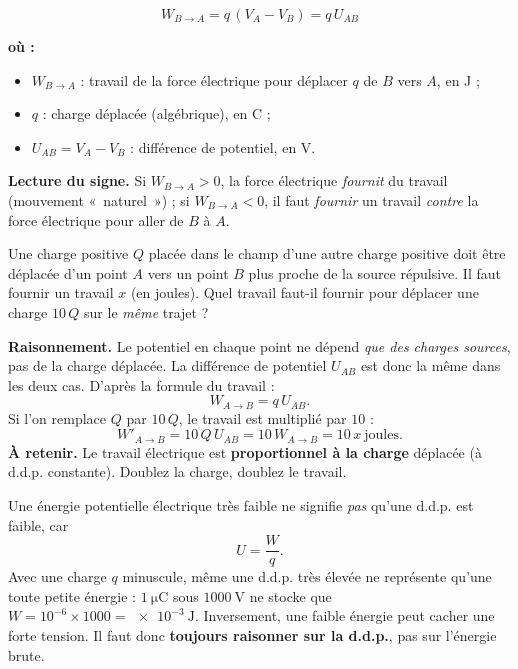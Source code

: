 \documentclass[11pt,a4paper]{article}
\newenvironment{ou}{%
  \par\smallskip\noindent\textbf{où :}\nopagebreak
  \begin{itemize}[leftmargin=1.8em,topsep=2pt,itemsep=1.5pt,parsep=0pt]}%
  {\end{itemize}}
\begin{document}
\begin{formule}
\[ \boxed{\;W_{B\to A} = q\,(V_A - V_B) = q\,U_{AB}\;} \]
\begin{ou}
  \item $W_{B\to A}$ : travail de la force électrique pour déplacer $q$ de $B$ vers $A$, en
        \si{\joule} ;
  \item $q$ : charge déplacée (algébrique), en \si{\coulomb} ;
  \item $U_{AB} = V_A - V_B$ : différence de potentiel, en \si{\volt}.
\end{ou}
\textbf{Lecture du signe.} Si $W_{B\to A}>0$, la force électrique \emph{fournit} du travail
(mouvement «~naturel~») ; si $W_{B\to A}<0$, il faut \emph{fournir} un travail \emph{contre} la
force électrique pour aller de $B$ à $A$.
\end{formule}

\begin{exemple}
Une charge positive $Q$ placée dans le champ d'une autre charge positive doit être déplacée d'un
point $A$ vers un point $B$ plus proche de la source répulsive. Il faut fournir un travail $x$
(en joules). Quel travail faut-il fournir pour déplacer une charge $10\,Q$ sur le \emph{même}
trajet ?

\textbf{Raisonnement.} Le potentiel en chaque point ne dépend \emph{que des charges sources}, pas
de la charge déplacée. La différence de potentiel $U_{AB}$ est donc la même dans les deux cas.
D'après la formule du travail :
\[ W_{A\to B} = q\,U_{AB}. \]
Si l'on remplace $Q$ par $10\,Q$, le travail est multiplié par $10$ :
\[ W'_{A\to B} = 10\,Q\,U_{AB} = 10\,W_{A\to B} = 10\,x\ \text{joules}. \]
\textbf{À retenir.} Le travail électrique est \textbf{proportionnel à la charge} déplacée (à
d.d.p. constante). Doublez la charge, doublez le travail.
\end{exemple}

\begin{attention}
Une énergie potentielle électrique très faible ne signifie \emph{pas} qu'une d.d.p. est faible, car
\[ U = \frac{W}{q}. \]
Avec une charge $q$ minuscule, même une d.d.p. très élevée ne représente qu'une toute petite
énergie : $1~\mathrm{\mu C}$ sous $\SI{1000}{\volt}$ ne stocke que $W = 10^{-6}\times 1000 =
\SI{e-3}{\joule}$. Inversement, une faible énergie peut cacher une forte tension. Il faut donc
\textbf{toujours raisonner sur la d.d.p.}, pas sur l'énergie brute.
\end{attention}
\end{document}
